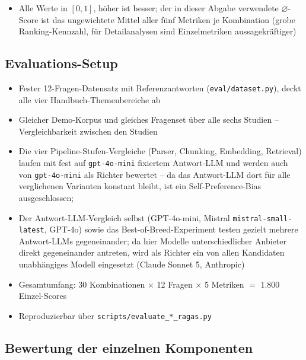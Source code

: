 \documentclass[11pt,a4paper]{article}
\begin{document}
\begin{itemize}
\begin{itemize}
        \item Braucht Referenzantwort; F1-Score über atomare Fakten (generierte Antwort vs.\ Referenz)
        \item Durchgängig niedrigste Metrik (typisch 0,4--0,7) -- normal bei striktem Fakten-F1 gegen manuell formulierte Referenzen, nicht direkt mit den anderen vier Metriken vergleichbar
    \end{itemize}
    \item Alle Werte in $[0,1]$, höher ist besser; der in dieser Abgabe verwendete $\varnothing$-Score ist das ungewichtete Mittel aller fünf Metriken je Kombination (grobe Ranking-Kennzahl, für Detailanalysen sind Einzelmetriken aussagekräftiger)
\end{itemize}

\subsection{Evaluations-Setup}
\begin{itemize}
    \item Fester 12-Fragen-Datensatz mit Referenzantworten (\texttt{eval/dataset.py}), deckt alle vier Handbuch-Themenbereiche ab
    \item Gleicher Demo-Korpus und gleiches Fragenset über alle sechs Studien -- Vergleichbarkeit zwischen den Studien
    \item Die vier Pipeline-Stufen-Vergleiche (Parser, Chunking, Embedding, Retrieval) laufen mit fest auf \texttt{gpt-4o-mini} fixiertem Antwort-LLM und werden auch von \texttt{gpt-4o-mini} als Richter bewertet -- da das Antwort-LLM dort für alle verglichenen Varianten konstant bleibt, ist ein Self-Preference-Bias ausgeschlossen; 
    \item Der Antwort-LLM-Vergleich selbst (GPT-4o-mini, Mistral \texttt{mistral-small-latest}, GPT-4o) sowie das Best-of-Breed-Experiment testen gezielt mehrere Antwort-LLMs gegeneinander; da hier Modelle unterschiedlicher Anbieter direkt gegeneinander antreten, wird als Richter ein von allen Kandidaten unabhängiges Modell eingesetzt (Claude Sonnet 5, Anthropic)
    \item Gesamtumfang: 30 Kombinationen $\times$ 12 Fragen $\times$ 5 Metriken $=$ 1.800 Einzel-Scores
    \item Reproduzierbar über \texttt{scripts/evaluate\_*\_ragas.py}
\end{itemize}

\subsection{Bewertung der einzelnen Komponenten}
\end{document}

